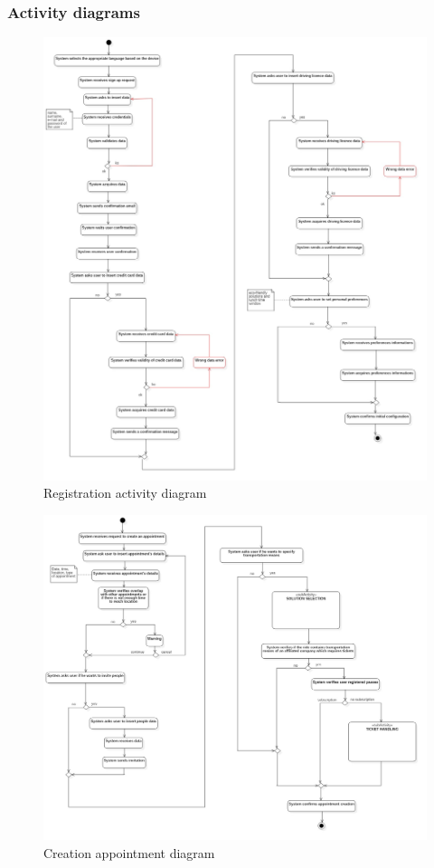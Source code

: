 	\subsubsection{Activity diagrams}
		\begin{figure}[H]
			\centerline{\includegraphics[height=0.75\paperheight]{Images/RegistrationDiagramAD}}
			\caption{Registration activity diagram}
		\end{figure}
		\begin{figure}[H]
			\centerline{\includegraphics[width=\paperwidth-1]{Images/CreationAppointmentAD}}
			\caption{Creation appointment diagram}
		\end{figure}
